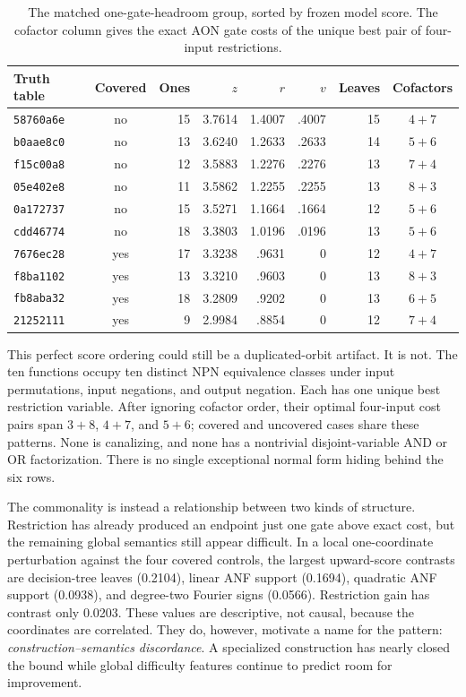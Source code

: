 \documentclass[11pt]{article}
\begin{document}
\begin{table}[H]
\centering\small
\caption{The matched one-gate-headroom group, sorted by frozen model score.
The cofactor column gives the exact AON gate costs of the unique best pair of
four-input restrictions.}
\begin{tabular}{lcrrrrrc}
\toprule
Truth table & Covered & Ones & $z$ & $r$ & $v$ & Leaves & Cofactors\\
\midrule
\texttt{58760a6e} & no  & 15 & 3.7614 & 1.4007 & .4007 & 15 & $4+7$\\
\texttt{b0aae8c0} & no  & 13 & 3.6240 & 1.2633 & .2633 & 14 & $5+6$\\
\texttt{f15c00a8} & no  & 12 & 3.5883 & 1.2276 & .2276 & 13 & $7+4$\\
\texttt{05e402e8} & no  & 11 & 3.5862 & 1.2255 & .2255 & 13 & $8+3$\\
\texttt{0a172737} & no  & 15 & 3.5271 & 1.1664 & .1664 & 12 & $5+6$\\
\texttt{cdd46774} & no  & 18 & 3.3803 & 1.0196 & .0196 & 13 & $5+6$\\
\midrule
\texttt{7676ec28} & yes & 17 & 3.3238 & .9631 & 0 & 12 & $4+7$\\
\texttt{f8ba1102} & yes & 13 & 3.3210 & .9603 & 0 & 13 & $8+3$\\
\texttt{fb8aba32} & yes & 18 & 3.2809 & .9202 & 0 & 13 & $6+5$\\
\texttt{21252111} & yes &  9 & 2.9984 & .8854 & 0 & 12 & $7+4$\\
\bottomrule
\end{tabular}
\label{tab:cases}
\end{table}

This perfect score ordering could still be a duplicated-orbit artifact.  It
is not.  The ten functions occupy ten distinct NPN equivalence classes under
input permutations, input negations, and output negation.  Each has one unique
best restriction variable.  After ignoring cofactor order, their optimal
four-input cost pairs span $3+8$, $4+7$, and $5+6$; covered and uncovered
cases share these patterns.  None is canalizing, and none has a nontrivial
disjoint-variable AND or OR factorization.  There is no single exceptional
normal form hiding behind the six rows.

The commonality is instead a relationship between two kinds of structure.
Restriction has already produced an endpoint just one gate above exact cost,
but the remaining global semantics still appear difficult.  In a local
one-coordinate perturbation against the four covered controls, the largest
upward-score contrasts are decision-tree leaves (0.2104), linear ANF support
(0.1694), quadratic ANF support (0.0938), and degree-two Fourier signs
(0.0566).  Restriction gain has contrast only 0.0203.  These values are
descriptive, not causal, because the coordinates are correlated.  They do,
however, motivate a name for the pattern: \emph{construction--semantics
discordance}.  A specialized construction has nearly closed the bound while
global difficulty features continue to predict room for improvement.
\end{document}

